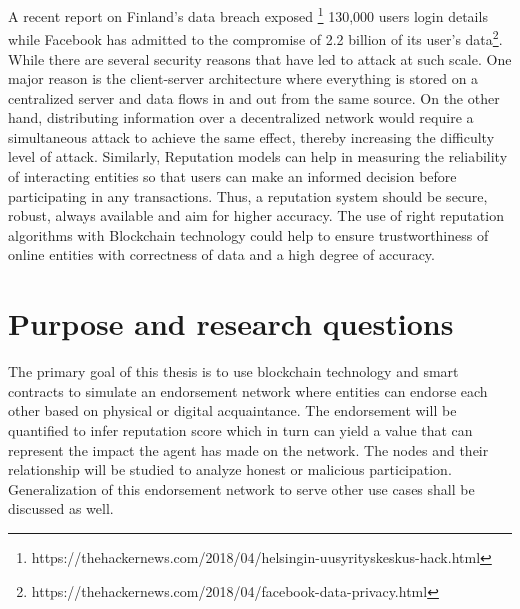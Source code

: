 A recent report on Finland's data breach exposed
\footnote{https://thehackernews.com/2018/04/helsingin-uusyrityskeskus-hack.html}
130,000 users login details while Facebook has admitted to the compromise of
2.2 billion of its user's
data\footnote{https://thehackernews.com/2018/04/facebook-data-privacy.html}.
While there are several security reasons that have led to attack at such scale.
One major reason is the client-server architecture where everything is stored
on a centralized server and data flows in and out from the same source. On the
other hand, distributing information over a decentralized network would require
a simultaneous attack to achieve the same effect, thereby increasing the
difficulty level of attack. Similarly, Reputation models can help in measuring
the reliability of interacting entities so that users can make an informed
decision before participating in any transactions. Thus, a reputation system
should be secure, robust, always available and aim for higher accuracy. The use
of right reputation algorithms with Blockchain technology could help to ensure
trustworthiness of online entities with correctness of data and a high degree
of accuracy.  


\section{Purpose and research questions} \label{ResearchQuestions}

The primary goal of this thesis is to use blockchain technology and smart
contracts to simulate an endorsement network where entities can endorse each
other based on physical or digital acquaintance. The endorsement will be
quantified to infer reputation score which in turn can yield a value that can
represent the impact the agent has made on the network.  The nodes and their
relationship will be studied to analyze honest or malicious participation.
Generalization of this endorsement network to serve other use cases shall be
discussed as well. 

